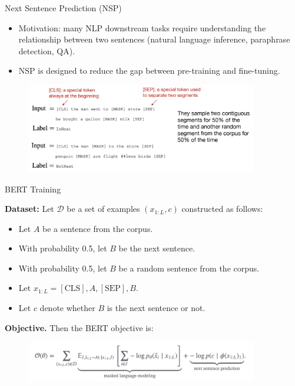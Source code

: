 \documentclass[serif, aspectratio=169]{beamer}
\begin{document}
\begin{frame}{Next Sentence Prediction (NSP)}
    \begin{itemize}
        \item Motivation: many NLP downstream tasks require understanding the relationship between two sentences (natural language inference, paraphrase detection, QA).
        \item NSP is designed to reduce the gap between pre-training and fine-tuning.
    \end{itemize}
    \begin{figure}
            \centering
            \includegraphics[width=0.9\textwidth]{Figures/NSP.png}
    \end{figure}
\end{frame}

\begin{frame}{BERT Training}

    \vspace{0.5cm}
    
    \textbf{Dataset:} Let $\mathcal{D}$ be a set of examples $(x_{1:L}, c)$ constructed as follows:
    
    \vspace{0.3cm}
    
    \begin{itemize}
        \item Let $A$ be a sentence from the corpus.
        \item With probability 0.5, let $B$ be the next sentence.
        \item With probability 0.5, let $B$ be a random sentence from the corpus.
        \item Let $x_{1:L} = [\text{CLS}], A, [\text{SEP}], B$.
        \item Let $c$ denote whether $B$ is the next sentence or not.
    \end{itemize}
    
    \textbf{Objective.} Then the BERT objective is:
    \begin{figure}
            \centering
            \includegraphics[width=0.9\textwidth]{Figures/Objective.png}
    \end{figure}

\end{frame}
\end{document}
